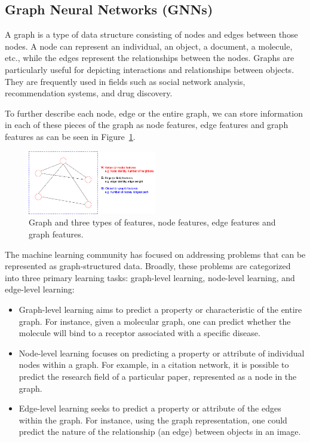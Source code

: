 \subsection{Graph Neural Networks (GNNs)}\label{subsec:graph-neural-networks-(gnns)}
A graph is a type of data structure consisting of nodes and edges between those nodes.
A node can represent an individual, an object, a document, a molecule, etc., while the edges represent the relationships between the nodes.
Graphs are particularly useful for depicting interactions and relationships between objects.
They are frequently used in fields such as social network analysis, recommendation systems, and drug discovery.


To further describe each node, edge or the entire graph, we can store information in each of these pieces of the graph as node features, edge features and graph features as can be seen in Figure~\ref{fig:graph}.

\begin{figure}[htb!]
    \centering
    \includegraphics[width=0.5\textwidth]{figures/Graph.drawio}
    \caption{Graph and three types of features, node features, edge features and graph features.}
    \label{fig:graph}
\end{figure}


The machine learning community has focused on addressing problems that can be represented as graph-structured data.
Broadly, these problems are categorized into three primary learning tasks: graph-level learning, node-level learning, and edge-level learning:


\begin{itemize}
  \item Graph-level learning aims to predict a property or characteristic of the entire graph.
  For instance, given a molecular graph, one can predict whether the molecule will bind to a receptor associated with a specific disease.
  \item Node-level learning focuses on predicting a property or attribute of individual nodes within a graph.
  For example, in a citation network, it is possible to predict the research field of a particular paper, represented as a node in the graph.
  \item Edge-level learning seeks to predict a property or attribute of the edges within the graph.
  For instance, using the graph representation, one could predict the nature of the relationship (an edge) between objects in an image.
\end{itemize}


